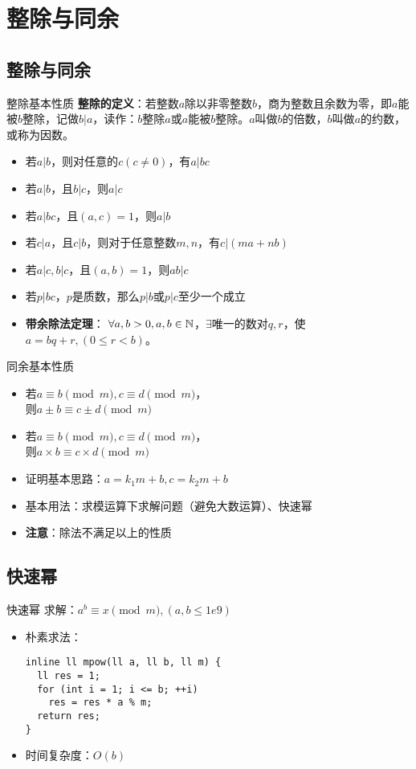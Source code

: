 \section{整除与同余}
\subsection{整除与同余}
\begin{frame}{整除基本性质}
\textbf{整除的定义}：若整数$a$除以非零整数$b$，商为整数且余数为零，即$a$能被$b$整除，记做$b|a$，读作：$b$整除$a$或$a$能被$b$整除。$a$叫做$b$的倍数，$b$叫做$a$的约数，或称为因数。
\pause
\begin{itemize}
  \item 若$a|b$，则对任意的$c(c\neq 0)$，有$a|bc$
  \item 若$a|b$，且$b|c$，则$a|c$
  \item 若$a|bc$，且$(a,c)=1$，则$a|b$
  \item 若$c|a$，且$c|b$，则对于任意整数$m,n$，有$c|(ma+nb)$
  \item 若$a|c,b|c$，且$(a,b)=1$，则$ab|c$
  \item 若$p|bc$，$p$是质数，那么$p|b$或$p|c$至少一个成立
  \item \textbf{带余除法定理}： $\forall a,b>0, a,b\in \mathbb{N}$，$\exists$唯一的数对$q,r$，使$a=bq+r,(0\leq r<b)$。
\end{itemize}
\end{frame}


\begin{frame}{同余基本性质}
\begin{itemize}
  \item 若$a\equiv b\pmod{m},c\equiv d\pmod{m}$，\\则$a\pm b\equiv c\pm d\pmod{m}$
  \item 若$a\equiv b\pmod{m},c\equiv d\pmod{m}$，\\则$a\times b\equiv c\times d\pmod{m}$ \pause
  \item 证明基本思路：$a=k_1m+b,c=k_2m+b$ \pause
  \item 基本用法：求模运算下求解问题（避免大数运算）、快速幂 \pause
  \item \textbf{注意}：除法不满足以上的性质
\end{itemize}
\end{frame}

\subsection{快速幂}
\begin{frame}[fragile]{快速幂}
  求解：$a^b\equiv x\pmod{m},(a,b\leq 1e9)$
  \vspace{0.5cm}
  \pause
\begin{itemize}
  \item 朴素求法：
\begin{lstlisting}
inline ll mpow(ll a, ll b, ll m) {
  ll res = 1;
  for (int i = 1; i <= b; ++i) 
    res = res * a % m;
  return res;
}
\end{lstlisting}
  \item 时间复杂度：$O(b)$
\end{itemize}
\end{frame}


